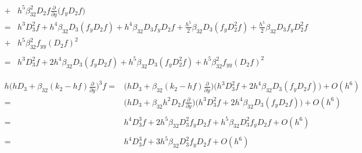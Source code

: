 \documentclass[12 pt]{article}
\begin{document}
{\begin{align*}
																		+&h^{5}\beta_{32}^{2}D_{2}f\frac{\partial}{\partial y}\bigg(f_{y}D_{2}f\bigg)\\
																		=& h^{3}D_{3}^{2}f + h^{4}\beta_{32}D_{3}(f_{y}D_{2}f) + h^{4}\beta_{32}D_{3}f_{y}D_{2}f + \frac{h^{5}}{2}\beta_{32}D_{3}(f_{y}D_{2}^{2}f) + \frac{h^{5}}{2}\beta_{32}D_{3}f_{y}D_{2}^{2}f\\
																		+& h^{5}\beta_{32}^{2}f_{yy}(D_{2}f)^{2}\\
																		&\\
																		=&  h^{3}D_{3}^{2}f + 2h^{4}\beta_{32}D_{3}(f_{y}D_{2}f) + h^{5}\beta_{32}D_{3}(f_{y}D_{2}^{2}f) + h^{5}\beta_{32}^{2}f_{yy}(D_{2}f)^{2}
\end{align*}
}

{
\large
\begin{align*}
h\bigg(hD_{3}+\beta_{32}(k_{2}-hf)\frac{\partial}{\partial y}\bigg)^{3}f =& \bigg(hD_{3}+\beta_{32}(k_{2}-hf)\frac{\partial}{\partial y}\bigg)\bigg(h^{3}D_{3}^{2}f + 2h^{4}\beta_{32}D_{3}(f_{y}D_{2}f)\bigg) + O(h^{6})\\
																		=& \bigg(hD_{3}+\beta_{32}h^{2}D_{2}f\frac{\partial}{\partial y}\bigg)\bigg(h^{3}D_{3}^{2}f + 2h^{4}\beta_{32}D_{3}(f_{y}D_{2}f)\bigg) + O(h^{6})\\
																		&\\
																		=& h^{4}D_{3}^{3}f + 2h^{5}\beta_{32}D_{3}^{2}f_{y}D_{2}f + h^{5}\beta_{32}D_{3}^{2}f_{y}D_{2}f + O(h^{6})\\
																		&\\
																		=& h^{4}D_{3}^{3}f + 3h^{5}\beta_{32}D_{3}^{2}f_{y}D_{2}f + O(h^{6})\\
\end{align*}
}
\end{document}
